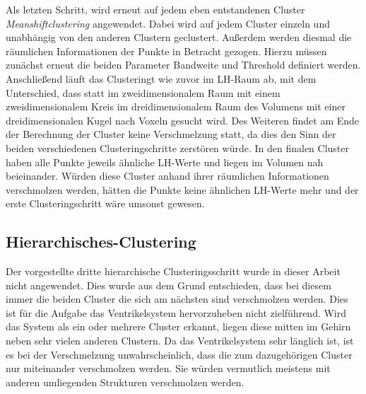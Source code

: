 Als letzten Schritt, wird erneut auf jedem eben entstandenen Cluster \textit{Meanshiftclustering} angewendet. Dabei wird auf jedem Cluster einzeln und unabhängig von den anderen Clustern geclustert. Außerdem werden diesmal die räumlichen Informationen der Punkte in Betracht gezogen.
\newline
Hierzu müssen zunächst erneut die beiden Parameter Bandweite und Threshold definiert werden.
\newline
Anschließend läuft das Clusteringt wie zuvor im LH-Raum ab, mit dem Unterschied, dass statt im zweidimensionalem Raum mit einem zweidimensionalem Kreis im dreidimensionalem Raum des Volumens mit einer dreidimensionalen Kugel nach Voxeln gesucht wird.
\newline
Des Weiteren findet am Ende der Berechnung der Cluster keine Verschmelzung statt, da dies den Sinn der beiden verschiedenen Clusteringschritte zerstören würde. In den finalen Cluster haben alle Punkte jeweils ähnliche LH-Werte und liegen im Volumen nah beieinander.
\newline
Würden diese Cluster anhand ihrer räumlichen Informationen verschmolzen werden, hätten die Punkte keine ähnlichen LH-Werte mehr und der erste Clusteringschritt wäre umsonst gewesen.



\subsection{Hierarchisches-Clustering}

Der vorgestellte dritte hierarchische Clusteringsschritt wurde in dieser Arbeit nicht angewendet. Dies wurde aus dem Grund entschieden, dass bei diesem immer die beiden Cluster die sich am nächsten sind verschmolzen werden.
 \newline
Dies ist für die Aufgabe das Ventrikelsystem hervorzuheben nicht zielführend. Wird das System als ein oder mehrere Cluster erkannt, liegen diese mitten im Gehirn neben sehr vielen anderen Clustern.
\newline
Da das Ventrikelsystem sehr länglich ist, ist es bei der Verschmelzung unwahrscheinlich, dass die zum dazugehörigen Cluster nur miteinander verschmolzen werden. Sie würden vermutlich meistens mit anderen umliegenden Strukturen verschmolzen werden.

